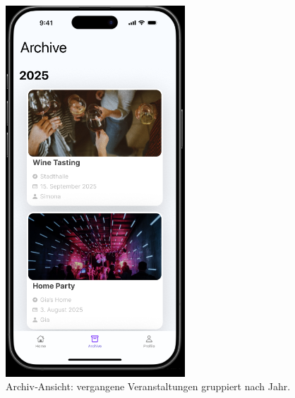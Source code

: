 \documentclass[11pt,a4paper]{article}
\begin{document}
\begin{figure}[h]
  \centering
  \includegraphics[width=0.6\textwidth]{image-4.png}
  \caption{Archiv‑Ansicht: vergangene Veranstaltungen gruppiert nach Jahr.}
  \label{fig:archive}
\end{figure}
\end{document}

